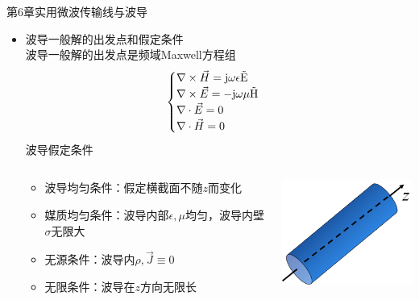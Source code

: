 \begin{frame}{第6章\quad 实用微波传输线与波导}
    \begin{itemize}
        \item 波导一般解的出发点和假定条件\\
              波导一般解的出发点是频域Maxwell方程组
              \begin{align}
                  \begin{cases}
                      \nabla\times\vec{H}=\rm{j}\omega\epsilon\vec{E} \\
                      \nabla\times\vec{E}=-\rm{j}\omega\mu\vec{H}     \\
                      \nabla\cdot\vec{E}=0                            \\
                      \nabla\cdot\vec{H}=0
                  \end{cases}\label{eqn6-1}
              \end{align}
              波导假定条件
              \begin{columns}
                  \begin{column}{0.5\linewidth}
                      \begin{itemize}
                          \item 波导均匀条件：假定横截面不随$z$而变化
                          \item 媒质均匀条件：波导内部$\epsilon,\mu$均匀，波导内壁$\sigma$无限大
                          \item 无源条件：波导内$\rho,\vec{J}\equiv 0$
                          \item 无限条件：波导在$z$方向无限长
                      \end{itemize}
                  \end{column}
                  \begin{column}{0.5\linewidth}
                      \includegraphics[width=5cm]{fig6-1.png}
                  \end{column}
              \end{columns}
    \end{itemize}
\end{frame}

